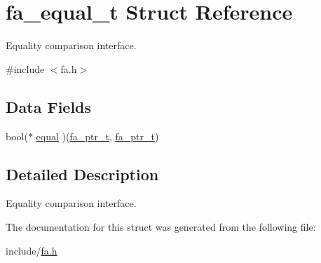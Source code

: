\hypertarget{structfa__equal__t}{\section{fa\-\_\-equal\-\_\-t Struct Reference}
\label{structfa__equal__t}
}


Equality comparison interface.  




{\ttfamily \#include $<$fa.\-h$>$}

\subsection*{Data Fields}
\begin{DoxyCompactItemize}
\item 
bool($\ast$ \hyperlink{structfa__equal__t_acd1ed940afe1760fc0246fb6e774445f}{equal} )(\hyperlink{group___fa_ga915ddeae99ad7568b273d2b876425197}{fa\-\_\-ptr\-\_\-t}, \hyperlink{group___fa_ga915ddeae99ad7568b273d2b876425197}{fa\-\_\-ptr\-\_\-t})
\end{DoxyCompactItemize}


\subsection{Detailed Description}
Equality comparison interface. 

The documentation for this struct was generated from the following file\-:\begin{DoxyCompactItemize}
\item 
include/\hyperlink{fa_8h}{fa.\-h}\end{DoxyCompactItemize}
